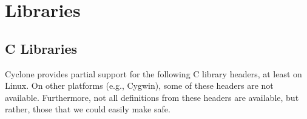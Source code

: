 \section{Libraries}

\ifscreen
{}
\else
{}
\fi

\subsection{C Libraries}
Cyclone provides partial support for the following C library headers,
at least on Linux.  On other platforms (e.g., Cygwin), some of these
headers are not available.  Furthermore, not all definitions from
these headers are available, but rather, those that we could easily
make safe.

